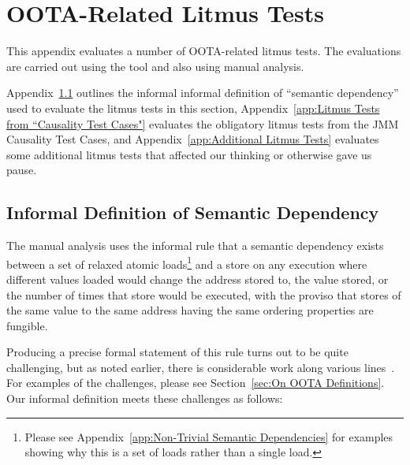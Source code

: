 \documentclass[10]{article}
\begin{document}
\clearpage
\appendix

\section{OOTA-Related Litmus Tests}
\label{app:OOTA-Related Litmus Tests}

This appendix evaluates a number of OOTA-related litmus tests.
The evaluations are carried out using the  tool and also
using manual analysis.

Appendix~\ref{app:Informal Definition of Semantic Dependency}
outlines the informal informal definition of ``semantic dependency''
used to evaluate the litmus tests in this section,
Appendix~\ref{app:Litmus Tests from “Causality Test Cases"}
evaluates the obligatory litmus tests from the JMM Causality Test
Cases, and
Appendix~\ref{app:Additional Litmus Tests}
evaluates some additional litmus tests that affected our thinking or
otherwise gave us pause.

\subsection{Informal Definition of Semantic Dependency}
\label{app:Informal Definition of Semantic Dependency}

The manual analysis uses the informal rule that a semantic dependency
exists between a set of relaxed atomic loads\footnote{
	Please see
	Appendix~\ref{app:Non-Trivial Semantic Dependencies}
	for examples showing why this is a set of loads rather than a
	single load.}
and a store on any execution where different values loaded would change
the address stored to, the value stored, or the number of times that
store would be executed, with the proviso that stores of the same value
to the same address having the same ordering properties are fungible.

Producing a precise formal statement of this rule turns out to be quite
challenging, but as noted earlier, there is considerable work along
various
lines~\cite{Lahav:2017:RSC:3062341.3062352,Sinclair:2017:CAR:3079856.3080206,Lee:10.1145/3385412.3386010,MarkBatty2019ModularRelaxedDependenciesOOTA}.
For examples of the challenges, please see
Section~\ref{sec:On OOTA Definitions}.
Our informal definition meets these challenges as follows:
\end{document}
